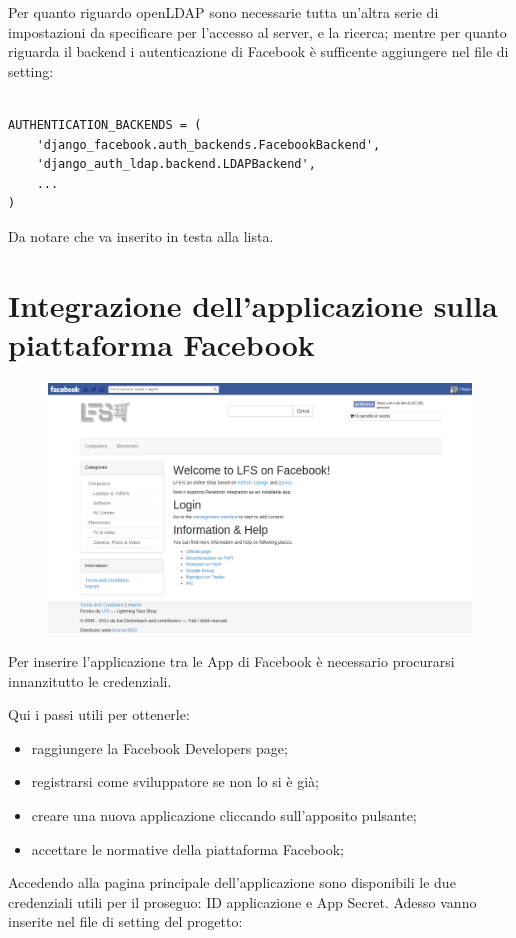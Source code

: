 Per quanto riguardo openLDAP sono necessarie tutta un'altra serie di impostazioni da specificare per l'accesso al server, e la ricerca; mentre per quanto riguarda il backend i autenticazione di Facebook è sufficente aggiungere nel file di setting:

\begin{lstlisting}

AUTHENTICATION_BACKENDS = (
	'django_facebook.auth_backends.FacebookBackend',
	'django_auth_ldap.backend.LDAPBackend',
	...
)

\end{lstlisting}

Da notare che va inserito in testa alla lista.

\section{Integrazione dell'applicazione sulla piattaforma Facebook}

\begin{figure}
\includegraphics[width=0.9\columnwidth]{img/main_page}
\end{figure}

Per inserire l'applicazione tra le App di Facebook è necessario procurarsi innanzitutto le credenziali.

Qui i passi utili per ottenerle:
\begin{itemize}
	\item raggiungere la Facebook Developers page;
	\item registrarsi come sviluppatore se non lo si è già;
	\item creare una nuova applicazione cliccando sull'apposito pulsante;
	\item accettare le normative della piattaforma Facebook;
\end{itemize}
Accedendo alla pagina principale dell'applicazione sono disponibili le due credenziali utili per il proseguo: ID applicazione e App Secret.
Adesso vanno inserite nel file di setting del progetto:

